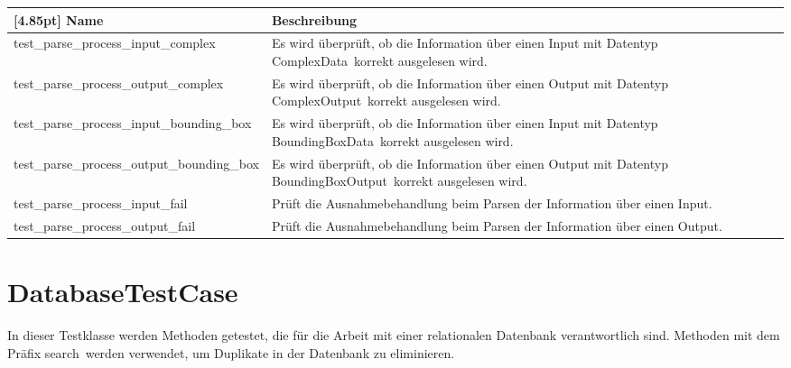 	
	\begin{center}
		\renewcommand{\arraystretch}{1.5}
		\setlength\tabcolsep{5pt}
		\begin{tabularx}{\textwidth}{|l|X|}
			\hline
			\rowcolor[gray]{0.75}[4.85pt]
			Name & Beschreibung \\ \hline
			test\_parse\_process\_input\_complex & Es wird überprüft, ob die Information über einen Input mit Datentyp \glqq ComplexData\grqq \ korrekt ausgelesen wird. \\ \hline
			test\_parse\_process\_output\_complex & Es wird überprüft, ob die Information über einen Output mit Datentyp \glqq ComplexOutput\grqq \ korrekt ausgelesen wird. \\ \hline
			test\_parse\_process\_input\_bounding\_box & Es wird überprüft, ob die Information über einen Input mit Datentyp \glqq BoundingBoxData\grqq \ korrekt ausgelesen wird. \\ \hline
			test\_parse\_process\_output\_bounding\_box & Es wird überprüft, ob die Information über einen Output mit Datentyp \glqq BoundingBoxOutput\grqq \ korrekt ausgelesen wird. \\ \hline
			test\_parse\_process\_input\_fail & Prüft die Ausnahmebehandlung beim Parsen der Information über einen  Input. \\ \hline
			test\_parse\_process\_output\_fail & Prüft die Ausnahmebehandlung beim Parsen der Information über einen Output.\\ \hline
		\end{tabularx}
	\end{center}	
	

    \newpage

	\section{DatabaseTestCase}
	In dieser Testklasse werden Methoden getestet, die für die Arbeit mit einer relationalen Datenbank verantwortlich sind. Methoden mit dem Präfix \glqq search\grqq \ werden verwendet, um Duplikate in der Datenbank zu eliminieren.
	
